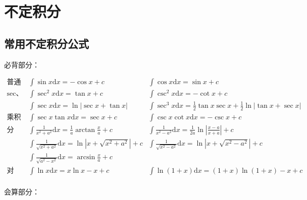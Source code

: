 
\chapter{不定积分}


\section{常用不定积分公式}

必背部分：

\begin{equation*}
  \begin{array}{lll}
    \text{普通三角：}& \int \sin x \mathrm{d}x = - \cos x + c& \int \cos x \mathrm{d}x = \sin x + c\\
    \text{sec、csc：}                   & \int \sec^2 x \mathrm{d}x = \tan x + c& \int \csc^2 x \mathrm{d}x = - \cot x + c\\
    & \int \sec x \mathrm{d} x = \ln|\sec x + \tan x| & \int \sec^3 x \mathrm{d} x = \frac{1}{2}\tan x \sec x + \frac{1}{2}\ln |\tan x + \sec x|\\
    \text{乘积三角：} & \int \sec x \tan x \mathrm{d}x = \sec x + c& \int \csc x\cot x \mathrm{d}x = - \csc x + c\\
    \text{分式：}& \int \frac{1}{x^2 + a^2} \mathrm{d}x = \frac{1}{a} \arctan \frac{x}{a} + c & \int \frac{1}{x^2 - a^2}\mathrm{d}x = \frac{1}{2a} \ln |\frac{x-a}{x+a}| + c\\
   & \int \frac{1}{\sqrt{x^2 + a^2}} \mathrm{d}x = \ln |x + \sqrt{x^2 + a^2}|+c& \int \frac{1}{\sqrt{x^2 - a^2}} \mathrm{d}x = \ln |x + \sqrt{x^2 - a^2}| + c \\
   & \int \frac{1}{\sqrt{a^2 - x^2}}\mathrm{d}x = \arcsin \frac{x}{a} + c& \\
    \text{对数：}&\int \ln x \mathrm{d} x = x \ln x - x + c&\int \ln(1 + x)\mathrm{d} x = (1+x) \ln(1+x) - x + c \\
  \end{array}
\end{equation*}

会算部分：

